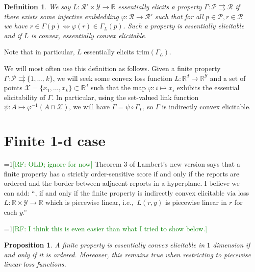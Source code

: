 \documentclass[12pt]{article}
\newcommand{\Comments}{1}
\newcommand{\mynote}[2]{\ifnum\Comments=1\textcolor{#1}{#2}\fi}
\newcommand{\raf}[1]{\mynote{green}{[RF: #1]}}
\newcommand{\reals}{\mathbb{R}}
\renewcommand{\P}{\mathcal{P}}
\newcommand{\R}{\mathcal{R}}
\newcommand{\X}{\mathcal{X}}
\newcommand{\Y}{\mathcal{Y}}
\renewcommand{\P}{\mathcal{P}}
\newcommand{\toto}{\rightrightarrows}
\newcommand{\trim}{\mathrm{trim}}
\newtheorem{proposition}{Proposition}
\newtheorem{definition}{Definition}
\begin{document}
\begin{definition}
  We say $L:\R'\times\Y\to\reals$ \emph{essentially elicits} a property $\Gamma : \P \toto \R$ if there exists some injective embdedding $\varphi:\R\to\R'$ such that for all $p\in\P,r\in\R$ we have $r \in \Gamma(p) \iff \varphi(r) \in \Gamma_L(p)$.
  Such a property is \emph{essentially elicitable} and if $L$ is convex, \emph{essentially convex elicitable}.
\end{definition}
Note that in particular, $L$ essentially elicits $\trim(\Gamma_L)$.

We will most often use this definition as follows.
Given a finite property $\Gamma : \P \toto \{1,\ldots,k\}$, we will seek some convex loss function $L : \reals^d \to \reals^\Y$ and a set of points $\X=\{x_1,\ldots,x_k\} \subset \reals^d$ such that the map $\varphi:i\mapsto x_i$ exhibits the essential elicitability of $\Gamma$.
In particular, using the set-valued link function $\psi:A\mapsto \varphi^{-1}(A\cap\X)$, we will have $\Gamma = \psi \circ \Gamma_L$, so $\Gamma$ is indirectly convex elicitable.

\section{Finite 1-d case}

\raf{OLD; ignore for now}
Theorem 3 of Lambert's new version says that a finite property has a strictly order-sensitive score if and only if the reports are ordered and the border between adjacent reports in a hyperplane.
I believe we can add: ``, if and only if the finite property is indirectly convex elicitable via loss $L : \reals \times \Y \to \reals$ which is piecewise linear, i.e.,\ $L(r,y)$ is piecewise linear in $r$ for each $y$.''

\raf{I think this is even easier than what I tried to show below.}
\begin{proposition}
  A finite property is essentially convex elicitable in $1$ dimension if and only if it is ordered.
  Moreover, this remains true when restricting to piecewise linear loss functions.
\end{proposition}
\end{document}
